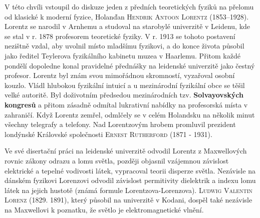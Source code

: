       V této chvíli vstoupil do diskuze jeden z předních teoretických fyziků na přelomu od klasické
      k moderní fyzice, Holanďan \textsc{Hendrik Antoon Lorentz} (1853–1928). Lorentz se narodil v
      Arnhemu a studoval na starobylé univerzitě v Leidenu, kde se stal v r. 1878 profesorem
      teoretické fyziky. V r. 1913 se tohoto postavení nezištně vzdal, aby uvolnil místo mladšímu
      fyzikovi, a do konce života působil jako ředitel Teylerova fyzikálního kabinetu muzea v
      Haarlemu. Přitom každé pondělí dopoledne konal pravidelné přednášky na leidenské univerzitě
      jako čestný profesor. Lorentz byl znám svou mimořádnou skromností, vyzařoval osobní kouzlo.
      Vládl hlubokou fyzikální intuicí a u mezinárodní fyzikální obce se těšil velké autoritě. Byl
      doživotním předsedou mezinárodních tzv. \textbf{Solvayovských kongresů} a přitom zásadně
      odmítal lukrativní nabídky na profesorská místa v zahraničí. Když Lorentz zemřel, odmlčely se
      v celém Holandsku na několik minut všechny telegrafy a telefony. Nad Lorentzovým hrobem
      promluvil prezident londýnské Královské společnosti \textsc{Ernest Rutherford} (1871 - 1931).

      \begin{tcnote}
        Ve své disertační práci na leidenské univerzitě odvodil Lorentz z Maxwellových rovnic zákony
        odrazu a lomu světla, později objasnil vzájemnou závislost elektrické a tepelné vodivosti
        látek, vypracoval teorii disperze světla. Nezávisle na dánském fyzikovi Lorenzovi odvodil
        závislost permitivity dielektrik a indexu lomu látek na jejich hustotě (známá formule
        Lorentzova-Lorenzova). \textsc{Ludwig Valentin Lorenz} (1829. 1891), který působil na
        univerzitě v Kodani, dospěl také nezávisle na Maxwellovi k poznatku, že světlo je
        elektromagnetické vlnění.
      \end{tcnote}




